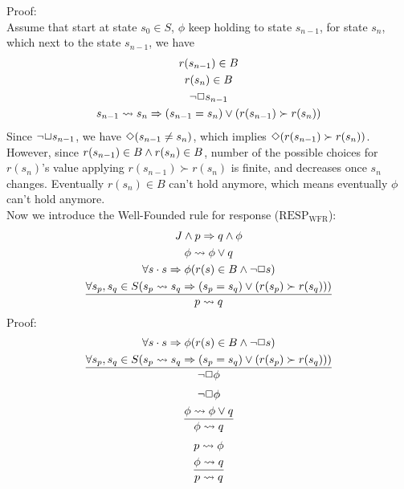 Proof:\\
Assume that start at state $s_0\in{S}$, $\phi$ keep holding to state $s_{n-1}$, for state $s_{n}$, which next to the state $s_{n-1}$, we have 
\begin{gather*}
  r(s_{n-1})\in{B}\\
  r(s_{n})\in{B}\\
  \neg\Box{s_{n-1}}\\
  s_{n-1}\rightsquigarrow{s_{n}}\Rightarrow({s_{n-1}}={s_{n}})\vee({r({s_{n-1}})}\succ{r({s_{n}})})
\end{gather*}
Since $\neg\Box{s_{n-1}}$, we have $\Diamond({{s_{n-1}}\neq{s_{n}}})$, which implies $\Diamond({r({s_{n-1}})}\succ{r({s_{n}})})$.\\
However, since $r(s_{n-1})\in{B}\wedge{r(s_{n})}\in{B}$, number of the possible choices for ${r(s_{n})}$'s value applying  ${r({s_{n-1}})}\succ{r({s_{n}})}$ is finite, and decreases once $s_{n}$ changes. Eventually ${r(s_{n})}\in{B}$ can't hold anymore, which means eventually $\phi$ can't hold anymore.\\
Now we introduce the Well-Founded rule for response (\texttt{$\mathrm{RESP_{WFR}}$}):
\begin{gather*}
  {J}\wedge{p}\Rightarrow{q}\wedge\phi\\
  \phi\rightsquigarrow{\phi\vee{q}}\\
  \forall{s}\cdot{s}\Rightarrow\phi({r(s)}\in{B}\wedge\neg\Box{s})\\
  \frac{\forall{s_{p}},{s_{q}}\in{S}(s_{p}\rightsquigarrow{s_{q}}\Rightarrow({s_{p}}={s_{q}})\vee({r({s_{p}})}\succ{r({s_{q}})}))}{p\rightsquigarrow{q}}
\end{gather*}
Proof:
\begin{gather*}
 \forall{s}\cdot{s}\Rightarrow\phi({r(s)}\in{B}\wedge\neg\Box{s})\\
 \frac{\forall{s_{p}},{s_{q}}\in{S}(s_{p}\rightsquigarrow{s_{q}}\Rightarrow({s_{p}}={s_{q}})\vee({r({s_{p}})}\succ{r({s_{q}})}))}{\neg\Box\phi}
\end{gather*}
\begin{gather*}
  \neg\Box\phi\\
  \frac{\phi\rightsquigarrow{\phi\vee{q}}}{\phi\rightsquigarrow{q}}
\end{gather*}
\begin{gather*}
  p\rightsquigarrow{\phi}\\
  \frac{\phi\rightsquigarrow{q}}{p\rightsquigarrow{q}}
\end{gather*}